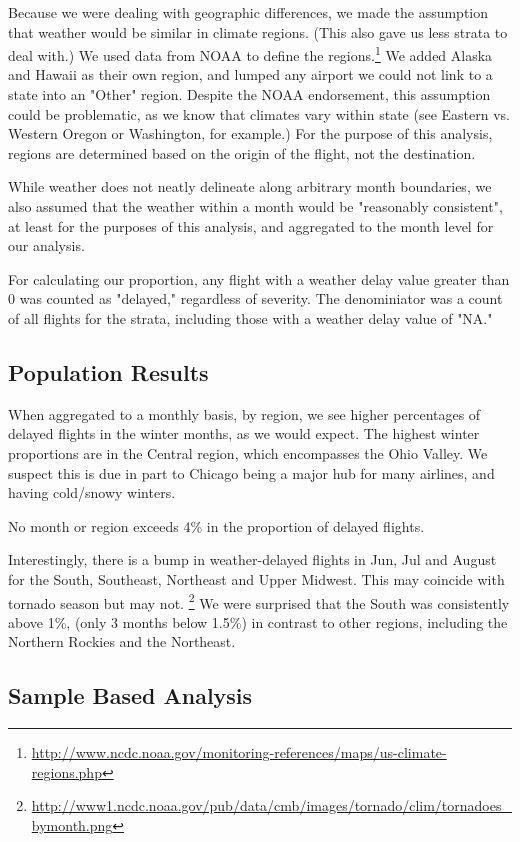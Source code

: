 \documentclass{article}
\begin{document}
Because we were dealing with geographic differences, we made the assumption that weather would be similar in climate regions. (This also gave us less strata to deal with.) We used data from NOAA to define the regions.\footnote{\url{http://www.ncdc.noaa.gov/monitoring-references/maps/us-climate-regions.php}} We added Alaska and Hawaii as their own region, and lumped any airport we could not link to a state into an "Other" region. Despite the NOAA endorsement, this assumption could be problematic, as we know that climates vary within state (see Eastern vs. Western Oregon or Washington, for example.) For the purpose of this analysis, regions are determined based on the origin of the flight, not the destination.

While weather does not neatly delineate along arbitrary month boundaries, we also assumed that the weather within a month would be "reasonably consistent", at least for the purposes of this analysis, and aggregated to the month level for our analysis.

For calculating our proportion, any flight with a weather delay value greater than 0 was counted as "delayed," regardless of severity. The denominiator was a count of all flights for the strata, including those with a weather delay value of "NA." 

\subsection{Population Results}
When aggregated to a monthly basis, by region, we see higher percentages of delayed flights in the winter months, as we would expect. The highest winter proportions are in the Central region, which encompasses the Ohio Valley. We suspect this is due in part to Chicago being a major hub for many airlines, and having cold/snowy winters.

No month or region exceeds 4\% in the proportion of delayed flights.

Interestingly, there is a bump in weather-delayed flights in Jun, Jul and August for the South, Southeast, Northeast and Upper Midwest. This may coincide with tornado season but may not. \footnote{\url{http://www1.ncdc.noaa.gov/pub/data/cmb/images/tornado/clim/tornadoes_bymonth.png}} We were surprised that the South was consistently above 1\%, (only 3 months below 1.5\%) in contrast to other regions, including the Northern Rockies and the Northeast.


\subsection{Sample Based Analysis}
\end{document}
